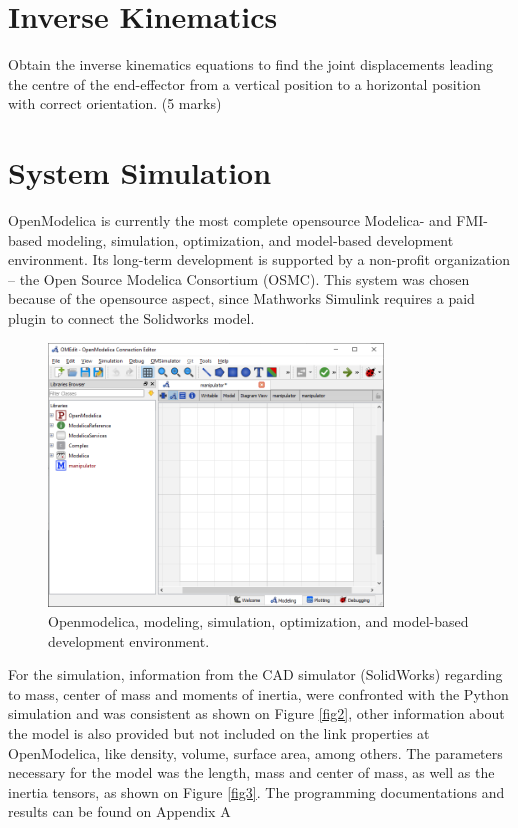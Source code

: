 \documentclass[transmag]{IEEEtran}
\begin{document}
\section{Inverse Kinematics}

Obtain the inverse kinematics equations to find the joint displacements leading the centre of the end-effector from a vertical position to a horizontal position with correct orientation. (5 marks)

\section{System Simulation}

OpenModelica is currently the most complete opensource Modelica- and FMI-based modeling, simulation, optimization, and model-based development environment. Its long-term development is supported by a non-profit organization – the Open Source Modelica Consortium (OSMC). \cite{ref2}
This system was chosen because of the opensource aspect, since Mathworks Simulink requires a paid plugin to connect the Solidworks model.


\begin{figure}
\centerline{\includegraphics[width=3.5in]{./images/openmodelica}}
\caption{Openmodelica, modeling, simulation, optimization, and model-based development environment.\label{fig1}}
\end{figure}


For the simulation, information from the CAD simulator (SolidWorks) regarding to mass, 
center of mass and moments of inertia, were confronted with the Python simulation and was 
consistent as shown on Figure \ref{fig2}, other information about the model is also provided but not included on the link properties at OpenModelica, like density, volume, surface area, among others. The parameters necessary for the model was the length, mass and center of mass, as well as the inertia tensors, as shown on Figure \ref{fig3}. The programming documentations and results can be found on Appendix A
\end{document}
